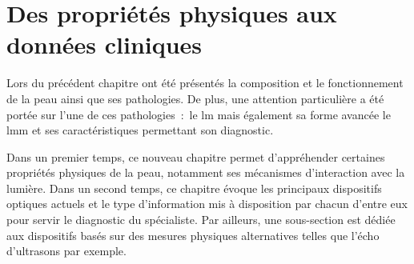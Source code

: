 \renewcommand{\thechapter}{\arabic{chapter}}
\setcounter{chapter}{1}

\chapter{Des propriétés physiques aux données cliniques}
\label{chap:chapter_2}
\chapterintro
Lors du précédent chapitre ont été présentés la composition et le fonctionnement de la peau ainsi que ses pathologies. De plus, une attention particulière a été portée sur l'une de ces pathologies~:~le \acrlong{lm} mais également sa forme avancée le \acrlong{lmm} et ses caractéristiques permettant son diagnostic.\par

Dans un premier temps, ce nouveau chapitre permet d'appréhender certaines propriétés physiques de la peau, notamment ses mécanismes d'interaction avec la lumière. Dans un second temps, ce chapitre évoque les principaux dispositifs optiques actuels et le type d'information mis à disposition par chacun d'entre eux pour servir le diagnostic du spécialiste. Par ailleurs, une sous-section est dédiée aux dispositifs basés sur des mesures physiques alternatives telles que l'écho d'ultrasons par exemple.\par
\newpage

